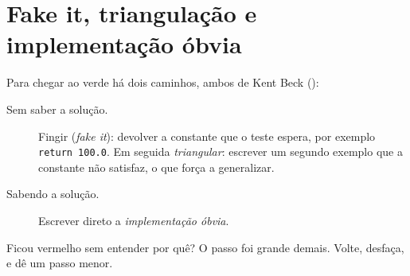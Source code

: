 \section{Fake it, triangulação e implementação óbvia}

Para chegar ao verde há dois caminhos, ambos de Kent Beck
():

\begin{description}
\item[Sem saber a solução.] Fingir (\emph{fake it}): devolver a constante
  que o teste espera, por exemplo \texttt{return 100.0}. Em seguida
  \emph{triangular}: escrever um segundo exemplo que a constante não
  satisfaz, o que força a generalizar.
\item[Sabendo a solução.] Escrever direto a \emph{implementação óbvia}.
\end{description}

Ficou vermelho sem entender por quê? O passo foi grande demais. Volte,
desfaça, e dê um passo menor.
